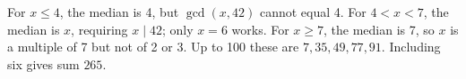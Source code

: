 For $x\le4$, the median is 4, but $\gcd(x,42)$ cannot equal 4. For $4<x<7$, the median is $x$, requiring $x\mid42$; only $x=6$ works. For $x\ge7$, the median is 7, so $x$ is a multiple of 7 but not of 2 or 3. Up to 100 these are $7,35,49,77,91$. Including six gives sum $\boxed{265}$.
